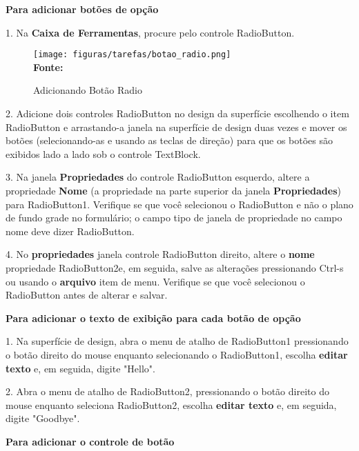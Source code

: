 \textbf{Para adicionar botões de opção}

1. Na \textbf{Caixa de Ferramentas}, procure pelo controle RadioButton.

\begin{figure}[ht!]
	\centering	
	\caption[\hspace{-0.1cm} Adicionando Botão Radio]{Adicionando Botão Radio}
	\vspace{-0.4cm}
	\texttt{[image: figuras/tarefas/botao\_radio.png]}
	\vspace{-0.2cm}
	\\\textbf{\footnotesize Fonte:~\cite {tutorial_visual:14} }
	\label{fig:radiobutton}
	\vspace{-0.5cm}
\end{figure}


2. Adicione dois controles RadioButton no design da superfície escolhendo o item RadioButton e arrastando-a janela na superfície de design duas vezes e mover os botões (selecionando-as e usando as teclas de direção) para que os botões são exibidos lado a lado sob o controle TextBlock.

3. Na janela \textbf{Propriedades} do controle RadioButton esquerdo, altere a propriedade \textbf{Nome} (a propriedade na parte superior da janela \textbf{Propriedades}) para RadioButton1. Verifique se que você selecionou o RadioButton e não o plano de fundo grade no formulário; o campo tipo de janela de propriedade no campo nome deve dizer RadioButton.

4. No \textbf{propriedades} janela controle RadioButton direito, altere o \textbf{nome} propriedade RadioButton2e, em seguida, salve as alterações pressionando Ctrl-s ou usando o \textbf{arquivo} item de menu. Verifique se que você selecionou o RadioButton antes de alterar e salvar. 


\textbf{Para adicionar o texto de exibição para cada botão de opção}

1. Na superfície de design, abra o menu de atalho de RadioButton1 pressionando o botão direito do mouse enquanto selecionando o RadioButton1, escolha \textbf{editar texto} e, em seguida, digite "Hello".

2. Abra o menu de atalho de RadioButton2, pressionando o botão direito do mouse enquanto seleciona RadioButton2, escolha \textbf{editar texto} e, em seguida, digite "Goodbye".

\textbf{Para adicionar o controle de botão}

